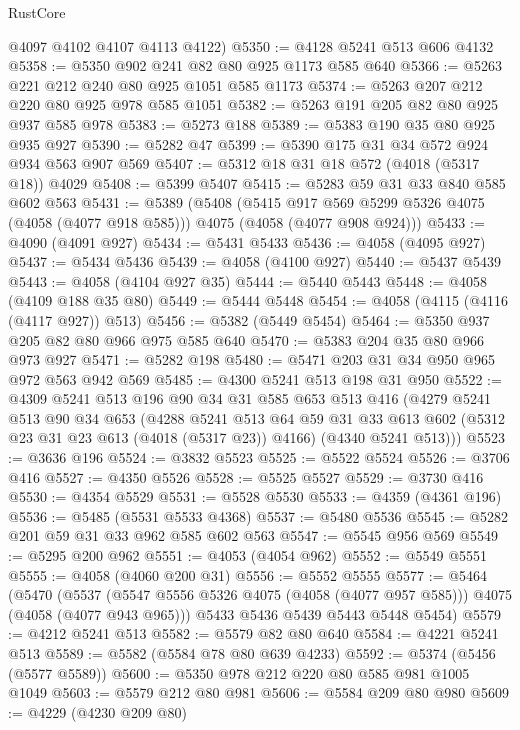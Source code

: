 \begin{lexlean}{RustCore}
\begin{coremodule}
      @4097
      @4102
      @4107
      @4113
      @4122)
@5350 := @4128 @5241 @513 @606 @4132
@5358 := @5350 @902 @241 @82 @80 @925 @1173 @585 @640
@5366 := @5263 @221 @212 @240 @80 @925 @1051 @585 @1173
@5374 := @5263 @207 @212 @220 @80 @925 @978 @585 @1051
@5382 := @5263 @191 @205 @82 @80 @925 @937 @585 @978
@5383 := @5273 @188
@5389 := @5383 @190 @35 @80 @925 @935 @927
@5390 := @5282 @47
@5399 := @5390 @175 @31 @34 @572 @924 @934 @563 @907 @569
@5407 := @5312 @18 @31 @18 @572 (@4018 (@5317 @18)) @4029
@5408 := @5399 @5407
@5415 := @5283 @59 @31 @33 @840 @585 @602 @563
@5431 := @5389
    (@5408
      (@5415 @917 @569 @5299 @5326 @4075 (@4058 (@4077 @918 @585)))
      @4075
      (@4058 (@4077 @908 @924)))
@5433 := @4090 (@4091 @927)
@5434 := @5431 @5433
@5436 := @4058 (@4095 @927)
@5437 := @5434 @5436
@5439 := @4058 (@4100 @927)
@5440 := @5437 @5439
@5443 := @4058 (@4104 @927 @35)
@5444 := @5440 @5443
@5448 := @4058 (@4109 @188 @35 @80)
@5449 := @5444 @5448
@5454 := @4058 (@4115 (@4116 (@4117 @927)) @513)
@5456 := @5382 (@5449 @5454)
@5464 := @5350 @937 @205 @82 @80 @966 @975 @585 @640
@5470 := @5383 @204 @35 @80 @966 @973 @927
@5471 := @5282 @198
@5480 := @5471 @203 @31 @34 @950 @965 @972 @563 @942 @569
@5485 := @4300 @5241 @513 @198 @31 @950
@5522 := @4309
    @5241
    @513
    @196
    @90
    @34
    @31
    @585
    @653
    @513
    @416
    (@4279
      @5241
      @513
      @90
      @34
      @653
      (@4288
        @5241
        @513
        @64
        @59
        @31
        @33
        @613
        @602
        (@5312 @23 @31 @23 @613 (@4018 (@5317 @23)) @4166)
        (@4340 @5241 @513)))
@5523 := @3636 @196
@5524 := @3832 @5523
@5525 := @5522 @5524
@5526 := @3706 @416
@5527 := @4350 @5526
@5528 := @5525 @5527
@5529 := @3730 @416
@5530 := @4354 @5529
@5531 := @5528 @5530
@5533 := @4359 (@4361 @196)
@5536 := @5485 (@5531 @5533 @4368)
@5537 := @5480 @5536
@5545 := @5282 @201 @59 @31 @33 @962 @585 @602 @563
@5547 := @5545 @956 @569
@5549 := @5295 @200 @962
@5551 := @4053 (@4054 @962)
@5552 := @5549 @5551
@5555 := @4058 (@4060 @200 @31)
@5556 := @5552 @5555
@5577 := @5464
    (@5470
      (@5537 (@5547 @5556 @5326 @4075 (@4058 (@4077 @957 @585))) @4075 (@4058 (@4077 @943 @965)))
      @5433
      @5436
      @5439
      @5443
      @5448
      @5454)
@5579 := @4212 @5241 @513
@5582 := @5579 @82 @80 @640
@5584 := @4221 @5241 @513
@5589 := @5582 (@5584 @78 @80 @639 @4233)
@5592 := @5374 (@5456 (@5577 @5589))
@5600 := @5350 @978 @212 @220 @80 @585 @981 @1005 @1049
@5603 := @5579 @212 @80 @981
@5606 := @5584 @209 @80 @980
@5609 := @4229 (@4230 @209 @80)

\end{coremodule}
\end{lexlean}
